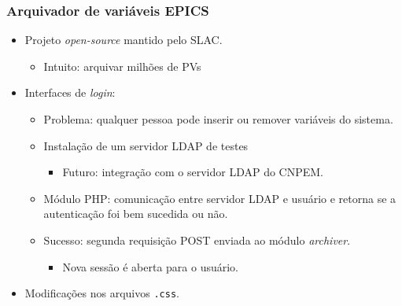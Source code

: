 \begin{frame}
\frametitle {Arquivador de variáveis EPICS}

\begin{itemize}
  \item Projeto \textit{open-source} mantido pelo SLAC.
  \begin{itemize}
    \item Intuito: arquivar milhões de PVs
  \end{itemize}
  
  \vspace{12pt}
  
  \item Interfaces de \textit{login}:
  \begin{itemize}
    \item Problema: qualquer pessoa pode inserir ou remover variáveis do
    sistema.
    \vspace{8pt}
    \item Instalação de um servidor LDAP de testes
    	\begin{itemize}
    	  \item Futuro: integração com o servidor LDAP do CNPEM.
    	\end{itemize}
    \vspace{8pt}
    \item Módulo PHP: comunicação entre servidor LDAP e usuário e
    retorna se a autenticação foi bem sucedida ou não.
    \vspace{8pt}
    \item Sucesso: segunda requisição POST enviada ao módulo \textit{archiver}.
    \begin{itemize}
      \item Nova sessão é aberta para o usuário.
    \end{itemize}
  \end{itemize}
  \vspace{8pt}
  \item Modificações nos arquivos \texttt{.css}.
\end{itemize}

\end{frame}


